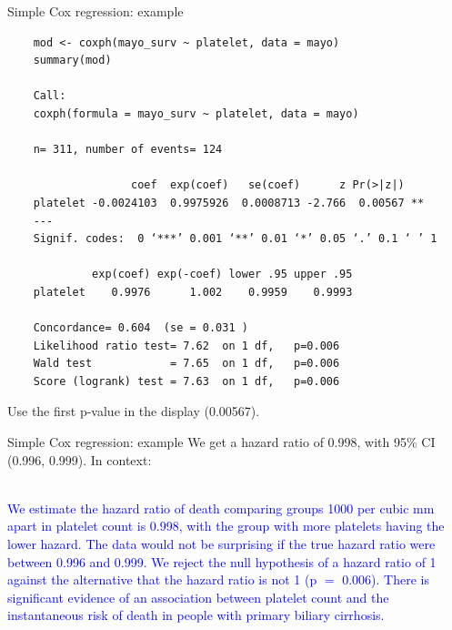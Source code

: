\documentclass[10pt,t]{beamer}
\begin{document}
\begin{frame}[fragile]{Simple Cox regression: example}

\vspace{-7 mm}

	\footnotesize
	\begin{verbatim}
	mod <- coxph(mayo_surv ~ platelet, data = mayo)
	summary(mod)
	
	Call:
	coxph(formula = mayo_surv ~ platelet, data = mayo)
	
	n= 311, number of events= 124 
	
	               coef  exp(coef)   se(coef)      z Pr(>|z|)   
	platelet -0.0024103  0.9975926  0.0008713 -2.766  0.00567 **
	---
	Signif. codes:  0 ‘***’ 0.001 ‘**’ 0.01 ‘*’ 0.05 ‘.’ 0.1 ‘ ’ 1
	
	         exp(coef) exp(-coef) lower .95 upper .95
	platelet    0.9976      1.002    0.9959    0.9993
	
	Concordance= 0.604  (se = 0.031 )
	Likelihood ratio test= 7.62  on 1 df,   p=0.006
	Wald test            = 7.65  on 1 df,   p=0.006
	Score (logrank) test = 7.63  on 1 df,   p=0.006
	\end{verbatim}
	
	\normalsize
	
	\smallskip
	Use the first p-value in the display (0.00567).
\end{frame}

\begin{frame}{Simple Cox regression: example}
	We get a hazard ratio of 0.998, with 95\% CI (0.996, 0.999). In context:
	\\ ~\ 
	
	\textcolor{blue}{We estimate the hazard ratio of death comparing groups 1000 per cubic mm apart in platelet count is 0.998, with the group with more platelets having the lower hazard. The data would not be surprising if the true hazard ratio were between 0.996 and 0.999. We reject the null hypothesis of a hazard ratio of 1 against the alternative that the hazard ratio is not 1 (p $=$ 0.006). There is significant evidence of an association between platelet count and the instantaneous risk of death in people with primary biliary cirrhosis.}
\end{frame}
\end{document}
